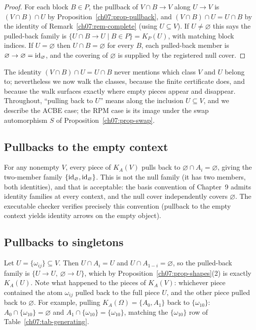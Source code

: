 \begin{proof}
For each block $B\in P$, the pullback of $V\cap B\to V$ along $U\to V$ is $(V\cap B)\cap U$ by Proposition~\ref{ch07:prop-pullback}, and $(V\cap B)\cap U=U\cap B$ by the identity of Remark~\ref{ch07:rem-complete} (using $U\subseteq V$). If $U\neq\varnothing$ this says the pulled-back family is $\{U\cap B\to U\mid B\in P\}=K_{P}(U)$, with matching block indices. If $U=\varnothing$ then $U\cap B=\varnothing$ for every $B$, each pulled-back member is $\varnothing\to\varnothing=\mathrm{id}_{\varnothing}$, and the covering of $\varnothing$ is supplied by the registered null cover.
\end{proof}

The identity $(V\cap B)\cap U=U\cap B$ never mentions which class $V$ and $U$ belong to; nevertheless we now walk the classes, because the finite certificate does, and because the walk surfaces exactly where empty pieces appear and disappear. Throughout, ``pulling back to $U$'' means along the inclusion $U\subseteq V$, and we describe the ACBE case; the RPM case is its image under the swap automorphism $S$ of Proposition~\ref{ch07:prop-swap}.

\subsection{Pullbacks to the empty context}
For any nonempty $V$, every piece of $K_{A}(V)$ pulls back to $\varnothing\cap A_{i}=\varnothing$, giving the two-member family $\{\mathrm{id}_{\varnothing},\mathrm{id}_{\varnothing}\}$. This is not the null family (it has two members, both identities), and that is acceptable: the basis convention of Chapter~9 admits identity families at every context, and the null cover independently covers $\varnothing$. The executable checker verifies precisely this convention (pullback to the empty context yields identity arrows on the empty object).

\subsection{Pullbacks to singletons}
Let $U=\{\omega_{ij}\}\subseteq V$. Then $U\cap A_{i}=U$ and $U\cap A_{1-i}=\varnothing$, so the pulled-back family is $\{U\to U,\ \varnothing\to U\}$, which by Proposition~\ref{ch07:prop-shapes}(2) is exactly $K_{A}(U)$. Note what happened to the pieces of $K_{A}(V)$: whichever piece contained the atom $\omega_{ij}$ pulled back to the full piece $U$, and the other piece pulled back to $\varnothing$. For example, pulling $K_{A}(\Omega)=\{A_{0},A_{1}\}$ back to $\{\omega_{10}\}$: $A_{0}\cap\{\omega_{10}\}=\varnothing$ and $A_{1}\cap\{\omega_{10}\}=\{\omega_{10}\}$, matching the $\{\omega_{10}\}$ row of Table~\ref{ch07:tab-generating}.


